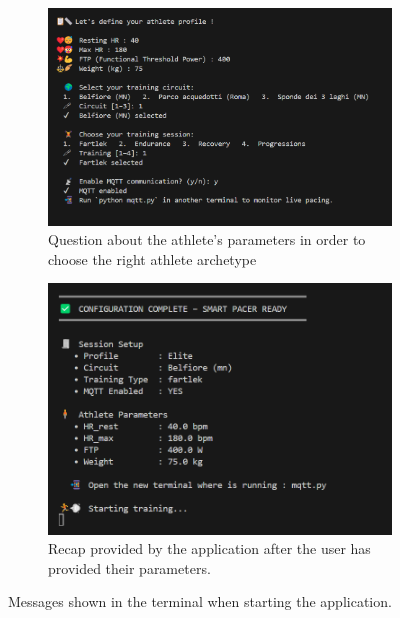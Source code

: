 \begin{figure}[htbp]
    \centering
    \begin{subfigure}[t]{0.52\textwidth}
      \includegraphics[width=\textwidth]{images/question_main.png}
      \caption{Question about the athlete's parameters in order to choose the right athlete archetype}
      \label{fig:main_question}
    \end{subfigure}
    \begin{subfigure}[t]{0.45\textwidth}
      \centering
      \includegraphics[width=\textwidth]{images/recap_main.png}
      \caption{Recap provided by the application after the user has provided their parameters.}
      \label{fig:recap_main}
    \end{subfigure}
    
    \caption{Messages shown in the terminal when starting the application.}
  \end{figure}



